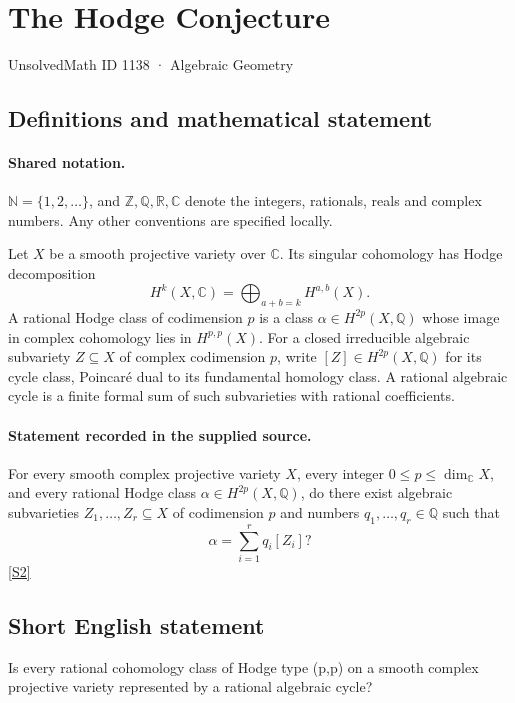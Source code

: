 \documentclass[11pt]{article}
\newcommand{\sref}[2]{\hyperlink{source:#1:#2}{[S#2]}}
\begin{document}
\setcounter{section}{1137}
\section{The Hodge Conjecture}\label{1138}
{\small\sffamily UnsolvedMath ID 1138 · Algebraic Geometry}
\subsection{Definitions and mathematical statement}

\paragraph{Shared notation.}$\mathbb N=\{1,2,\ldots\}$, and $\mathbb Z,\mathbb Q,\mathbb R,\mathbb C$ denote the integers, rationals, reals and complex numbers. Any other conventions are specified locally.


Let \(X\) be a smooth projective variety over \(\mathbb C\).
Its singular cohomology has Hodge decomposition
\[
 H^k(X,\mathbb C)=\bigoplus_{a+b=k}H^{a,b}(X).
\]
A rational Hodge class of codimension \(p\) is a class
\(\alpha\in H^{2p}(X,\mathbb Q)\) whose image in complex cohomology
lies in \(H^{p,p}(X)\).  For a closed irreducible algebraic subvariety
\(Z\subseteq X\) of complex codimension \(p\), write
\([Z]\in H^{2p}(X,\mathbb Q)\) for its cycle class, Poincar\'e dual to
its fundamental homology class.  A rational algebraic cycle is a finite
formal sum of such subvarieties with rational coefficients.
\paragraph{Statement recorded in the supplied source.}
For every smooth complex projective variety \(X\), every integer
\(0\le p\le\dim_{\mathbb C}X\), and every rational Hodge class
\(\alpha\in H^{2p}(X,\mathbb Q)\), do there exist algebraic subvarieties
\(Z_1,\ldots,Z_r\subseteq X\) of codimension \(p\) and numbers
\(q_1,\ldots,q_r\in\mathbb Q\) such that
\[
 \alpha=\sum_{i=1}^{r}q_i[Z_i]?
\] \sref{1138}{2}
\subsection{Short English statement}
Is every rational cohomology class of Hodge type (p,p) on a smooth complex projective variety represented by a rational algebraic cycle?
\end{document}

